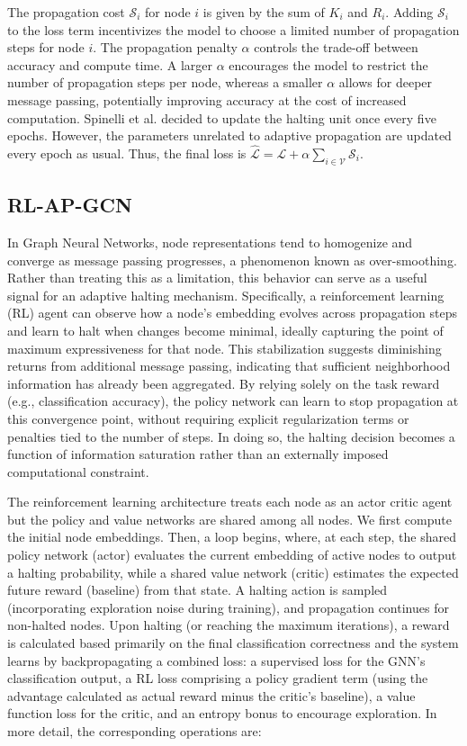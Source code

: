 \documentclass{gdl}
\begin{document}
 The propagation cost $\mathcal{S}_i$ for node $i$ is given by the sum of $K_i$ and $R_i$. Adding $\mathcal{S}_i$ to the loss term incentivizes the model to choose a limited number of propagation steps for node $i$. The propagation penalty $\alpha$ controls the trade-off between accuracy and compute time. A larger $\alpha$ encourages the model to restrict the number of propagation steps per node, whereas a smaller $\alpha$ allows for deeper message passing, potentially improving accuracy at the cost of increased computation. Spinelli et al. decided to update the halting unit once every five epochs. However, the parameters unrelated to adaptive propagation are updated every epoch as usual. Thus, the final loss is $ \mathcal{\hat{L}} = \mathcal{L} + \alpha \sum_{i\in \mathcal{V}} \mathcal{S}_i $.

\subsection{RL-AP-GCN}
In Graph Neural Networks, node representations tend to homogenize and converge as message passing progresses, a phenomenon known as over-smoothing. Rather than treating this as a limitation, this behavior can serve as a useful signal for an adaptive halting mechanism. Specifically, a reinforcement learning (RL) agent can observe how a node's embedding evolves across propagation steps and learn to halt when changes become minimal, ideally capturing the point of maximum expressiveness for that node. This stabilization suggests diminishing returns from additional message passing, indicating that sufficient neighborhood information has already been aggregated. By relying solely on the task reward (e.g., classification accuracy), the policy network can learn to stop propagation at this convergence point, without requiring explicit regularization terms or penalties tied to the number of steps. In doing so, the halting decision becomes a function of information saturation rather than an externally imposed computational constraint.

The reinforcement learning architecture treats each node as an actor critic agent but the policy and value networks are shared among all nodes. We first compute the initial node embeddings. Then, a loop begins, where, at each step, the shared policy network (actor) evaluates the current embedding of active nodes to output a halting probability, while a shared value network (critic) estimates the expected future reward (baseline) from that state. A halting action is sampled (incorporating exploration noise during training), and propagation continues for non-halted nodes. Upon halting (or reaching the maximum iterations), a reward is calculated based primarily on the final classification correctness and the system learns by backpropagating a combined loss: a supervised loss for the GNN's classification output, a RL loss comprising a policy gradient term (using the advantage calculated as actual reward minus the critic's baseline), a value function loss for the critic, and an entropy bonus to encourage exploration. In more detail, the corresponding operations are: 
\end{document}
